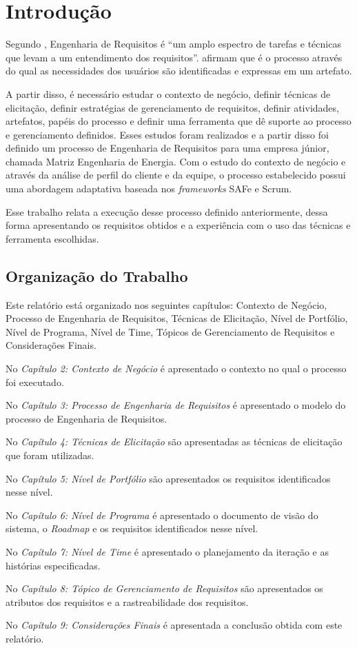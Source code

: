 \chapter[Introdução]{Introdução}

Segundo , Engenharia de Requisitos é ``um amplo
espectro de tarefas e técnicas que levam a um entendimento dos requisitos''.
 afirmam que é o processo através do qual as necessidades dos usuários 
são identificadas e expressas em um artefato.

A partir disso, é necessário estudar o contexto de negócio, definir técnicas de elicitação, 
definir estratégias de gerenciamento de requisitos, definir atividades, artefatos, papéis do processo
e definir uma ferramenta que dê suporte ao processo e gerenciamento definidos.
Esses estudos foram realizados e a partir disso foi definido um processo de Engenharia de Requisitos para uma empresa júnior, 
chamada Matriz Engenharia de Energia. Com o estudo do contexto de negócio e através da análise de perfil do cliente e da equipe, o processo
estabelecido possui uma abordagem adaptativa baseada nos \textit{frameworks} SAFe e Scrum. 

Esse trabalho relata a execução desse processo definido anteriormente, dessa forma apresentando os requisitos obtidos e 
a experiência com o uso das técnicas e ferramenta escolhidas.

\section{Organização do Trabalho}

Este relatório está organizado nos seguintes capítulos: Contexto de Negócio, Processo de Engenharia de Requisitos, Técnicas de Elicitação,
Nível de Portfólio, Nível de Programa, Nível de Time, Tópicos de Gerenciamento de Requisitos e Considerações Finais.

No \textit{Capítulo 2: Contexto de Negócio} é apresentado o contexto no qual o processo foi executado.

No \textit{Capítulo 3: Processo de Engenharia de Requisitos} é apresentado o modelo do processo de Engenharia de Requisitos.

No \textit{Capítulo 4: Técnicas de Elicitação} são apresentadas as técnicas de elicitação que foram utilizadas.

No \textit{Capítulo 5: Nível de Portfólio} são apresentados os requisitos identificados nesse nível.

No \textit{Capítulo 6: Nível de Programa} é apresentado o documento de visão do sistema, o \textit{Roadmap} e os requisitos identificados
nesse nível.

No \textit{Capítulo 7: Nível de Time} é apresentado o planejamento da iteração e as histórias especificadas.

No \textit{Capítulo 8: Tópico de Gerenciamento de Requisitos} são apresentados os atributos dos requisitos e a rastreabilidade dos requisitos.

No \textit{Capítulo 9: Considerações Finais} é apresentada a conclusão obtida
com este relatório.